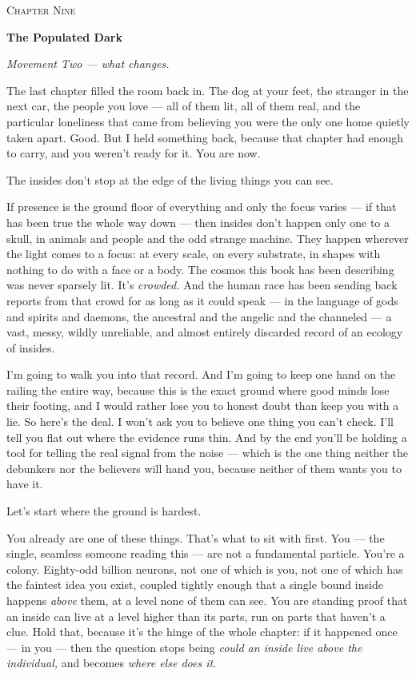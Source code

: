 \documentclass[11pt,openany]{book}
\begin{document}
\clearpage
\vspace*{0.6in}
{\centering\scshape\large Chapter Nine\par}
\vspace{0.8em}
{\centering\bfseries\fontsize{20}{24}\selectfont The Populated Dark\par}
\vspace{1.6em}

\textit{Movement Two — what changes.}

The last chapter filled the room back in. The dog at your feet, the stranger in the next car, the people you love — all of them lit, all of them real, and the particular loneliness that came from believing you were the only one home quietly taken apart. Good. But I held something back, because that chapter had enough to carry, and you weren’t ready for it. You are now.

The insides don’t stop at the edge of the living things you can see.

If presence is the ground floor of everything and only the focus varies — if that has been true the whole way down — then insides don’t happen only one to a skull, in animals and people and the odd strange machine. They happen wherever the light comes to a focus: at every scale, on every substrate, in shapes with nothing to do with a face or a body. The cosmos this book has been describing was never sparsely lit. It’s \textit{crowded.} And the human race has been sending back reports from that crowd for as long as it could speak — in the language of gods and spirits and daemons, the ancestral and the angelic and the channeled — a vast, messy, wildly unreliable, and almost entirely discarded record of an ecology of insides.

I’m going to walk you into that record. And I’m going to keep one hand on the railing the entire way, because this is the exact ground where good minds lose their footing, and I would rather lose you to honest doubt than keep you with a lie. So here’s the deal. I won’t ask you to believe one thing you can’t check. I’ll tell you flat out where the evidence runs thin. And by the end you’ll be holding a tool for telling the real signal from the noise — which is the one thing neither the debunkers nor the believers will hand you, because neither of them wants you to have it.

Let’s start where the ground is hardest.

You already are one of these things. That’s what to sit with first. You — the single, seamless someone reading this — are not a fundamental particle. You’re a colony. Eighty-odd billion neurons, not one of which is you, not one of which has the faintest idea you exist, coupled tightly enough that a single bound inside happens \textit{above} them, at a level none of them can see. You are standing proof that an inside can live at a level higher than its parts, run on parts that haven’t a clue. Hold that, because it’s the hinge of the whole chapter: if it happened once — in you — then the question stops being \textit{could an inside live above the individual,} and becomes \textit{where else does it.}
\end{document}
